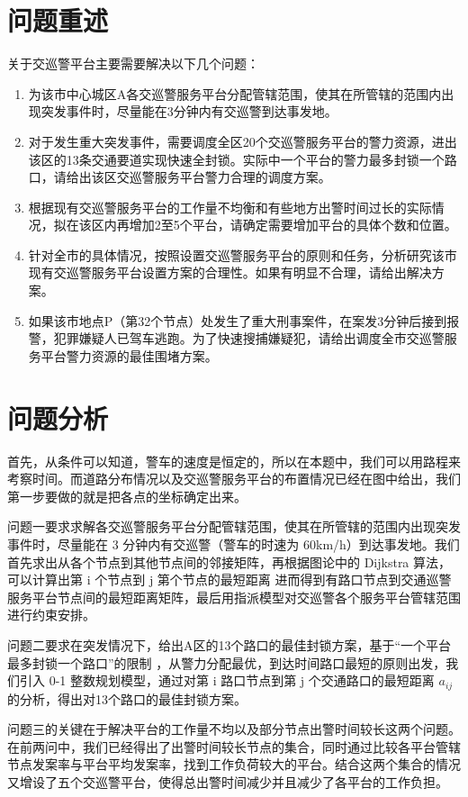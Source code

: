 \documentclass{cumcmthesis}
\begin{document}
\section{问题重述}
  关于交巡警平台主要需要解决以下几个问题：

  \begin{enumerate}
    \item 为该市中心城区A各交巡警服务平台分配管辖范围，使其在所管辖的范围内出现突发事件时，尽量能在3分钟内有交巡警到达事发地。
    \item 对于发生重大突发事件，需要调度全区20个交巡警服务平台的警力资源，进出该区的13条交通要道实现快速全封锁。实际中一个平台的警力最多封锁一个路口，请给出该区交巡警服务平台警力合理的调度方案。
    \item 根据现有交巡警服务平台的工作量不均衡和有些地方出警时间过长的实际情况，拟在该区内再增加2至5个平台，请确定需要增加平台的具体个数和位置。
    \item 针对全市的具体情况，按照设置交巡警服务平台的原则和任务，分析研究该市现有交巡警服务平台设置方案的合理性。如果有明显不合理，请给出解决方案。
    \item 如果该市地点P（第32个节点）处发生了重大刑事案件，在案发3分钟后接到报警，犯罪嫌疑人已驾车逃跑。为了快速搜捕嫌疑犯，请给出调度全市交巡警服务平台警力资源的最佳围堵方案。
  \end{enumerate}

\section{问题分析}

  首先，从条件可以知道，警车的速度是恒定的，所以在本题中，我们可以用路程来考察时间。而道路分布情况以及交巡警服务平台的布置情况已经在图中给出，我们第一步要做的就是把各点的坐标确定出来。

  问题一要求求解各交巡警服务平台分配管辖范围，使其在所管辖的范围内出现突发事件时，尽量能在 3 分钟内有交巡警（警车的时速为 60km/h）到达事发地。我们首先求出从各个节点到其他节点间的邻接矩阵，再根据图论中的 Dijkstra 算法，可以计算出第 i 个节点到 j 第个节点的最短距离 进而得到有路口节点到交通巡警服务平台节点间的最短距离矩阵，最后用指派模型对交巡警各个服务平台管辖范围进行约束安排。

  问题二要求在突发情况下，给出A区的13个路口的最佳封锁方案，基于“一个平台最多封锁一个路口”的限制 ，从警力分配最优，到达时间路口最短的原则出发，我们引入 0-1 整数规划模型，通过对第 i 路口节点到第 j 个交通路口的最短距离 $a_{ij}$的分析，得出对13个路口的最佳封锁方案。

  问题三的关键在于解决平台的工作量不均以及部分节点出警时间较长这两个问题。在前两问中，我们已经得出了出警时间较长节点的集合，同时通过比较各平台管辖节点发案率与平台平均发案率，找到工作负荷较大的平台。结合这两个集合的情况又增设了五个交巡警平台，使得总出警时间减少并且减少了各平台的工作负担。
\end{document}
